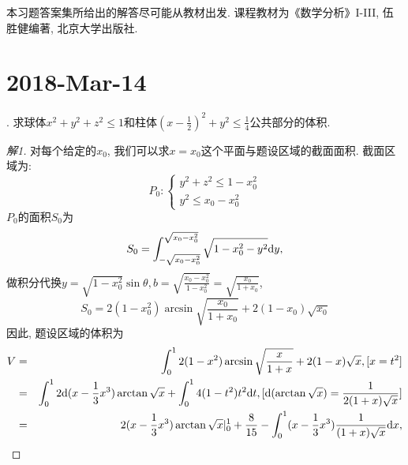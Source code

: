 \documentclass[a4paper,12pt]{article}
\author{龙子超}
\title{{\heiti {\zihao{3} 数学分析II-习题课}}}
\date{}
\begin{document}
\maketitle
%


本习题答案集所给出的解答尽可能从教材出发. 课程教材为《数学分析》I-III, 伍胜健编著,
北京大学出版社.
\section*{2018-Mar-14}
. 求球体$x^2+y^2+z^2\leq1$和柱体$(x-\frac{1}{2})^2+y^2\leq \frac{1}{4}$公共部分的体积.
\begin{proof}[解1]
  对每个给定的$x_0$, 我们可以求$x=x_0$这个平面与题设区域的截面面积. 截面区域为:
  \[P_0:\left\{\begin{array}{l}
    y^2+z^2\leq1-x_0^2\\
    y^2\leq x_0-x_0^2
  \end{array}
  \right.
    \]
    $P_0$的面积$S_0$为
    \[S_0=\int_{-\sqrt{x_0-x_0^2}}^{\sqrt{x_0-x_0^2}}\sqrt{1-x_0^2-y^2}\mathrm{d} y, \]
    做积分代换$y=\sqrt{1-x_0^2}\sin\theta,b=\sqrt{\frac{x_0-x_0^2}{1-x_0^2}}=\sqrt{\frac{x_0}{1+x_0}}$,
    \[S_0=2(1-x_0^2)\arcsin\sqrt{\frac{x_0}{1+x_0}}+2(1-x_0)\sqrt{x_0}\]
    因此, 题设区域的体积为
    \begin{eqnarray*}
      V&=&\int_0^1 2(1-x^2)\arcsin\sqrt{\frac{x}{1+x}}+2(1-x)\sqrt{x}, [x=t^2]\\
      &=&\int_0^12\mathrm{d}(x-\frac{1}{3}x^3)\arctan\sqrt{x}+\int_0^14(1-t^2)t^2\mathrm{d} t, [\mathrm{d}(\arctan\sqrt{x})=\frac{1}{2(1+x)\sqrt{x}}]\\
      &=&2(x-\frac{1}{3}x^3)\arctan\sqrt{x}|_0^1+\frac{8}{15}-\int_0^1(x-\frac{1}{3}x^3)\frac{1}{(1+x)\sqrt{x}}\mathrm{d} x,
    \end{eqnarray*}
\end{proof}




\end{document}
